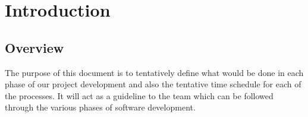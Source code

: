 \documentclass[
10pt, %
a4paper, %
oneside, %
headinclude,footinclude, %
BCOR5mm, %
]{scrartcl}
\title{\normalfont\spacedallcaps{Project Plan}} %
\author{\spacedlowsmallcaps{CS -01 D-Enigma}} %
\date{} %
\begin{document}

\renewcommand{\sectionmark}[1]{\markright{\spacedlowsmallcaps{#1}}} %
\lehead{\mbox{\llap{\small\thepage\kern1em\color{halfgray} \vline}\color{halfgray}\hspace{0.5em}\rightmark\hfil}} %

\pagestyle{scrheadings} %


\maketitle %

\setcounter{tocdepth}{2} %

\tableofcontents %


\newpage

\section{Introduction}

\subsection{\textbf{ Overview}}

The purpose of this document is to tentatively define what would be done in each phase of our project development and also the tentative time schedule for each of the processes. It will act as a guideline to the team which can be followed through the various phases of software development. 
\end{document}
